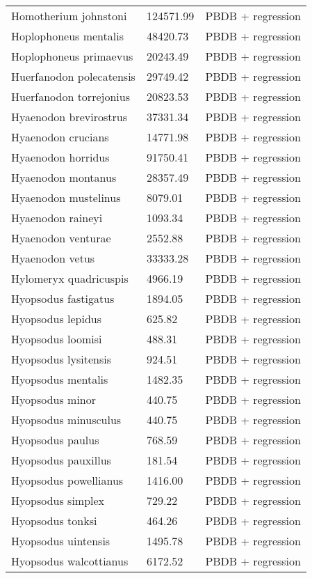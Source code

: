 \begin{center}
\begin{longtable}{p{} p{} p{} }
  Homotherium johnstoni & 124571.99 & PBDB + regression \\ 
  Hoplophoneus mentalis & 48420.73 & PBDB + regression \\ 
  Hoplophoneus primaevus & 20243.49 & PBDB + regression \\ 
  Huerfanodon polecatensis & 29749.42 & PBDB + regression \\ 
  Huerfanodon torrejonius & 20823.53 & PBDB + regression \\ 
  Hyaenodon brevirostrus & 37331.34 & PBDB + regression \\ 
  Hyaenodon crucians & 14771.98 & PBDB + regression \\ 
  Hyaenodon horridus & 91750.41 & PBDB + regression \\ 
  Hyaenodon montanus & 28357.49 & PBDB + regression \\ 
  Hyaenodon mustelinus & 8079.01 & PBDB + regression \\ 
  Hyaenodon raineyi & 1093.34 & PBDB + regression \\ 
  Hyaenodon venturae & 2552.88 & PBDB + regression \\ 
  Hyaenodon vetus & 33333.28 & PBDB + regression \\ 
  Hylomeryx quadricuspis & 4966.19 & PBDB + regression \\ 
  Hyopsodus fastigatus & 1894.05 & PBDB + regression \\ 
  Hyopsodus lepidus & 625.82 & PBDB + regression \\ 
  Hyopsodus loomisi & 488.31 & PBDB + regression \\ 
  Hyopsodus lysitensis & 924.51 & PBDB + regression \\ 
  Hyopsodus mentalis & 1482.35 & PBDB + regression \\ 
  Hyopsodus minor & 440.75 & PBDB + regression \\ 
  Hyopsodus minusculus & 440.75 & PBDB + regression \\ 
  Hyopsodus paulus & 768.59 & PBDB + regression \\ 
  Hyopsodus pauxillus & 181.54 & PBDB + regression \\ 
  Hyopsodus powellianus & 1416.00 & PBDB + regression \\ 
  Hyopsodus simplex & 729.22 & PBDB + regression \\ 
  Hyopsodus tonksi & 464.26 & PBDB + regression \\ 
  Hyopsodus uintensis & 1495.78 & PBDB + regression \\ 
  Hyopsodus walcottianus & 6172.52 & PBDB + regression \\ 

\end{longtable}
\end{center}
